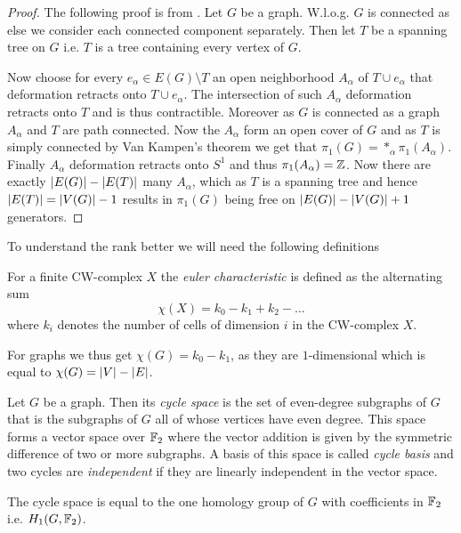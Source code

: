 \begin{proof}
	The following proof is from \cite[p. 43f]{hatcher00}.
	Let $G$ be a graph. W.l.o.g. $G$ is connected as else we consider each connected component separately. 
	Then let $T$ be a spanning tree on $G$ i.e. $T$ is a tree containing every vertex of $G$.

	Now choose for every $e_{\alpha} \in E(G) \setminus T$ an open neighborhood $A_{\alpha}$ of $T \cup e_{\alpha}$ that deformation retracts onto $T \cup e_{\alpha}$.
	The intersection of such $A_{\alpha}$ deformation retracts onto $T$ and is thus contractible. Moreover as $G$ is connected as a graph $A_{\alpha}$ and $T$ are path connected.
	Now the $A_{\alpha}$ form an open cover of $G$ and as $T$ is simply connected by Van Kampen's theorem we get that $\pi_{1}(G) = *_{\alpha} \pi_{1}(A_{\alpha})$.
	Finally $A_{\alpha}$ deformation retracts onto $S^{1}$ and thus $\pi_{1}(A_{\alpha}) = \mathbb{Z}$. Now there are exactly $\abs{E(G)} - \abs{E(T)}$ many $A_{\alpha}$,
	which as $T$ is a spanning tree and hence $\abs{E(T)} = \abs{V(G)}-1$ results in $\pi_1(G)$ being free on $\abs{E(G)} - \abs{V(G)} + 1$ generators.
\end{proof}

To understand the rank better we will need the following definitions
\begin{definition}
	For a finite CW-complex $X$ the \emph{euler characteristic} is defined as the alternating sum
	\[
		\chi(X) = k_0 - k_1 + k_2 - \ldots
	\] 
	where $k_{i}$ denotes the number of cells of dimension $i$ in the CW-complex $X$.
\end{definition}
For graphs we thus get $\chi (G) = k_0 - k_1$, as they are $1$-dimensional which is equal to $\chi(G) = \abs{V} - \abs{E}$.

\begin{definition}
	Let $G$ be a graph. Then its \emph{cycle space} is the set of even-degree subgraphs of $G$ that is the subgraphs of $G$ all of whose vertices have even degree. 
	This space forms a vector space over $\mathbb{F}_2$ where the vector addition is given by the symmetric difference of two or more subgraphs.
	A basis of this space is called \emph{cycle basis} and two cycles are \emph{independent} if they are linearly independent in the vector space.
\end{definition}

\begin{remark}
	The cycle space is equal to the one homology group of $G$ with coefficients in $\mathbb{F}_2$ i.e. $H_1(G,\mathbb{F}_2)$.
\end{remark}

